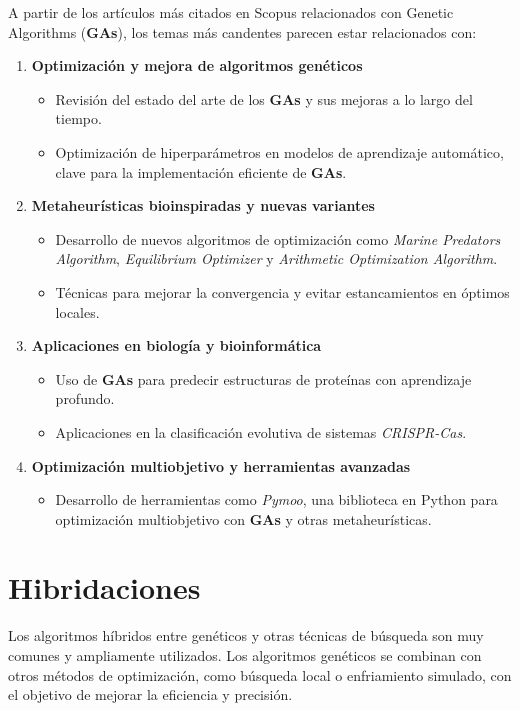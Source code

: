 \documentclass[12pt,letterpaper]{article}
\begin{document}
A partir de los artículos más citados en Scopus relacionados con Genetic Algorithms (\textbf{GAs}), los temas más candentes parecen estar relacionados con:
\begin{enumerate}
    \item \textbf{Optimización y mejora de algoritmos genéticos}
          \begin{itemize}
              \item Revisión del estado del arte de los \textbf{GAs} y sus mejoras a lo largo del tiempo.
              \item Optimización de hiperparámetros en modelos de aprendizaje automático, clave para la implementación eficiente de \textbf{GAs}.
          \end{itemize}

    \item \textbf{Metaheurísticas bioinspiradas y nuevas variantes}
          \begin{itemize}
              \item Desarrollo de nuevos algoritmos de optimización como \textit{Marine Predators Algorithm}, \textit{Equilibrium Optimizer} y \textit{Arithmetic Optimization Algorithm}.
              \item Técnicas para mejorar la convergencia y evitar estancamientos en óptimos locales.
          \end{itemize}

    \item \textbf{Aplicaciones en biología y bioinformática}
          \begin{itemize}
              \item Uso de \textbf{GAs} para predecir estructuras de proteínas con aprendizaje profundo.
              \item Aplicaciones en la clasificación evolutiva de sistemas \textit{CRISPR-Cas}.
          \end{itemize}

    \item \textbf{Optimización multiobjetivo y herramientas avanzadas}
          \begin{itemize}
              \item Desarrollo de herramientas como \textit{Pymoo}, una biblioteca en Python para optimización multiobjetivo con \textbf{GAs} y otras metaheurísticas.
          \end{itemize}
\end{enumerate}

\section{Hibridaciones}
Los algoritmos híbridos entre genéticos y otras técnicas de búsqueda son muy comunes y ampliamente utilizados. Los algoritmos genéticos se combinan con otros métodos de optimización, como búsqueda local o enfriamiento simulado, con el objetivo de mejorar la eficiencia y precisión.
\end{document}
